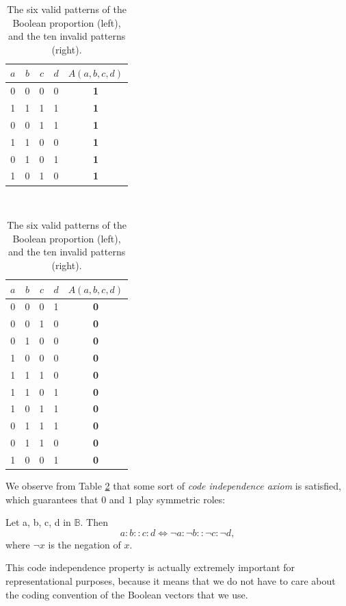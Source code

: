 \begin{table}[t]
  \centering
  \begin{tabular}[t]{ccccc}
    \toprule
    $a$ & $b$ & $c$ & $d$ &  $A(a, b, c, d)$\\
    \midrule
    0 & 0 & 0 & 0 &   \textbf{1}\\
    1 & 1 & 1 & 1 &   \textbf{1}\\
    0 & 0 & 1 & 1 &   \textbf{1}\\
    1 & 1 & 0 & 0 &   \textbf{1}\\
    0 & 1 & 0 & 1 &   \textbf{1}\\
    1 & 0 & 1 & 0 &   \textbf{1}\\
    \bottomrule
  \end{tabular}
  ~~~~
  \begin{tabular}[t]{ccccc}
    \toprule
    $a$ & $b$ & $c$ & $d$ &  $A(a, b, c, d)$\\
    \midrule
    0 & 0 & 0 & 1 &   \textbf{0}\\
    0 & 0 & 1 & 0 &   \textbf{0}\\
    0 & 1 & 0 & 0 &   \textbf{0}\\
    1 & 0 & 0 & 0 &   \textbf{0}\\
    1 & 1 & 1 & 0 &   \textbf{0}\\
    1 & 1 & 0 & 1 &   \textbf{0}\\
    1 & 0 & 1 & 1 &   \textbf{0}\\
    0 & 1 & 1 & 1 &   \textbf{0}\\
    0 & 1 & 1 & 0 &   \textbf{0}\\
    1 & 0 & 0 & 1 &   \textbf{0}\\
    \bottomrule
  \end{tabular}
  \caption{The six valid patterns of the Boolean proportion (left), and the ten
  invalid patterns (right).}
  \label{TAB:six_valid_patterns}
\end{table}

We observe from Table \ref{TAB:six_valid_patterns} that some
sort of {\it code independence axiom} is satisfied, which guarantees that $0$
and $1$ play symmetric roles:
\begin{property}
  \label{PROPER:code_indep}
  Let a, b, c, d in $\mathbb{B}$. Then
  $$a : b :: c : d \iff \neg a :  \neg b ::  \neg c :  \neg d,$$
  where $\neg x$ is the negation of $x$.
\end{property}
This code independence property is actually extremely important for
representational purposes, because it means that we do not have to care about
the coding convention of the Boolean vectors that we use.

